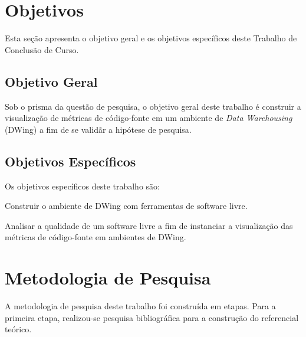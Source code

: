 
\section{Objetivos}

Esta seção apresenta o objetivo geral e os objetivos específicos deste Trabalho de Conclusão de Curso.

\subsection{Objetivo Geral}
Sob o prisma da questão de pesquisa, o objetivo geral deste trabalho é construir a visualização de métricas de código-fonte em um ambiente de \textit{Data Warehousing} (DWing) a fim de se validãr a hipótese de pesquisa.



\subsection{Objetivos Específicos}

Os objetivos específicos deste trabalho são:


\begin{objectives}

	\item Construir o ambiente de DWing com ferramentas de software livre.

	\item Analisar a qualidade de um software livre a fim de instanciar a visualização das métricas de código-fonte em ambientes de DWing.
	
    \end{objectives}
	



\section {Metodologia de Pesquisa}

A metodologia de pesquisa deste trabalho foi construída em etapas. Para a primeira etapa, realizou-se pesquisa bibliográfica para a construção do referencial teórico. 

